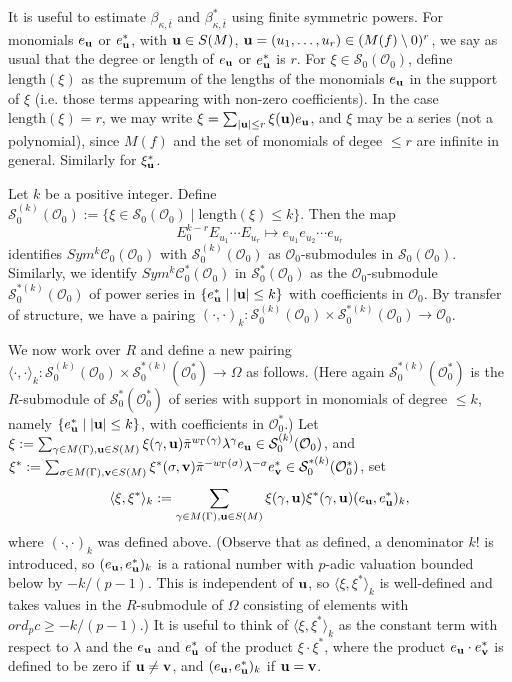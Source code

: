 \documentclass{article}
\theoremstyle{remark}
\def\c #1{ {\mathcal #1} }
\def\b #1{ {\bf #1} }
\begin{document}
\bigskip{} It is useful to estimate $\beta_{\kappa, \bar t}$ and $\beta_{\kappa, \bar t}^*$ using finite symmetric powers. For monomials $e_{\b u}$ or $e_{\b u}^*$, with $\b u \in S(M)$, $\b u = (u_1, \ldots, u_r) \in ( M(f) \setminus 0)^r$, we say  as usual that the degree or length of $e_{\b u}$ or $e_{\b u}^*$ is $r$. For $\xi \in \c S_0(\c O_0)$, define $\text{length}(\xi)$ as the supremum of the lengths of the monomials $e_{\b u}$ in the support of $\xi$ (i.e. those terms appearing with non-zero coefficients). In the case $\text{length}(\xi) = r$, we may write $\xi = \sum_{|\b u| \leq r} \xi(\b u) e_{\b u}$, and $\xi$ may be a series (not a polynomial), since $M(f)$ and the set of monomials of degee $\leq r$ are infinite in general.  Similarly for $\xi_{\b u}^*$. 

Let $k$ be a positive integer. Define $\c S_0^{(k)}(\c O_0) := \{ \xi \in \c S_0(\c O_0) \mid \text{length}(\xi) \leq k \}$. Then the map 
\[
E_0^{k-r} E_{u_1} \cdots E_{u_r} \longmapsto e_{u_1} e_{u_2} \cdots e_{u_r}
\]
identifies $Sym^{k} \c C_0(\c O_0)$ with $\c S_0^{(k)}(\c O_0)$ as $\c O_0$-submodules in $\c S_0(\c O_0)$. Similarly, we identify $Sym^k \c C_0^*(\c O_0)$ in $\c S_0^*(\c O_0)$ as the $\c O_0$-submodule $\c S_0^{*(k)}(\c O_0)$ of power series in $\{ e_{\b u}^* \mid | \b u| \leq k \}$ with coefficients in $\c O_0$. By transfer of structure, we have a pairing $(\cdot, \cdot)_k: \c S_0^{(k)}(\c O_0) \times \c S_0^{*(k)}(\c O_0) \rightarrow \c O_0$.

We now work over $R$ and define a new pairing $\langle \cdot, \cdot \rangle_k: \c S_0^{(k)}(\c O_0) \times \c S_0^{*(k)}(\c O_0^*) \rightarrow \Omega$ as follows. (Here again $\c S_0^{*(k)}(\c O_0^*)$ is the $R$-submodule of $\c S_0^*(\c O_0^*)$ of series with support in monomials of degree $\leq k$, namely $\{ e_{\b u}^* \mid |\b u| \leq k \}$, with coefficients in $\c O_0^*$.) Let $\xi := \sum_{\gamma \in M(\Gamma), \b u \in S(M)} \xi(\gamma, \b u) \tilde \pi^{w_\Gamma(\gamma)} \lambda^\gamma e_{\b u} \in  \c S_0^{(k)}(\c O_0)$, and $\xi^* := \sum_{\sigma \in M(\Gamma), \b v \in S(M)} \xi^*(\sigma, \b v) \tilde \pi^{-w_\Gamma(\sigma)} \lambda^{-\sigma} e_{\b v}^* \in \c S_0^{*(k)}(\c O_0^*)$, set
\[
\langle \xi, \xi^* \rangle_k := \sum_{\gamma \in M(\Gamma), \b u \in S(M)} \xi(\gamma, \b u) \xi^*(\gamma, \b u) (e_{\b u}, e_{\b u}^*)_k,
\]
where $(\cdot, \cdot)_k$ was defined above. (Observe that as defined, a denominator $k!$ is introduced, so $(e_{\b u}, e_{\b u}^*)_k$ is a rational number with $p$-adic valuation bounded below by $-k/(p-1)$. This is independent of $\b u$, so $\langle \xi, \xi^* \rangle_k$ is well-defined and takes values in the $R$-submodule of $\Omega$ consisting of elements with $ord_p c \geq -k / (p-1)$.) It is useful to think of $\langle \xi, \xi^* \rangle_k$ as the constant term with respect to  $\lambda$ and the $e_{\b u}$ and $e_{\b u}^*$ of the product $\xi \cdot \xi^*$, where the product $e_{\b u} \cdot e_{\b v}^*$ is defined to be zero if $\b u \not= \b v$, and $(e_{\b u}, e_{\b u}^*)_k$ if $\b u = \b v$.
\end{document}
